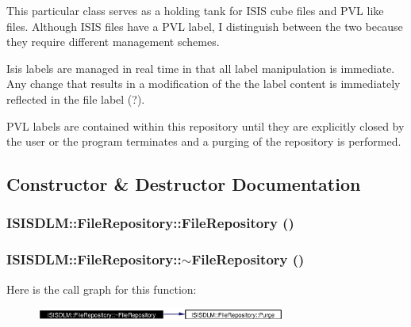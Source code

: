 This particular class serves as a holding tank for ISIS cube files and PVL like files. Although ISIS files have a PVL label, I distinguish between the two because they require different management schemes.

Isis labels are managed in real time in that all label manipulation is immediate. Any change that results in a modification of the the label content is immediately reflected in the file label (?).

PVL labels are contained within this repository until they are explicitly closed by the user or the program terminates and a purging of the repository is performed. 



\subsection{Constructor \& Destructor Documentation}
\subsubsection{\setlength{\rightskip}{0pt plus 5cm}ISISDLM::File\-Repository::File\-Repository ()\hspace{0.3cm}{\tt  [inline, protected]}}\label{classISISDLM_1_1FileRepository_b0}


\subsubsection{\setlength{\rightskip}{0pt plus 5cm}ISISDLM::File\-Repository::$\sim${\bf File\-Repository} ()\hspace{0.3cm}{\tt  [private]}}\label{classISISDLM_1_1FileRepository_d0}




Here is the call graph for this function:\begin{figure}[H]
\begin{center}
\leavevmode
\includegraphics[width=232pt]{classISISDLM_1_1FileRepository_d0_cgraph}
\end{center}
\end{figure}
